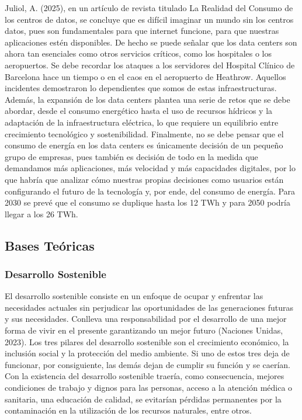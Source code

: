 \documentclass[stu,12pt,a4paper]{apa7}
\begin{document}
Juliol, A. (2025), en un artículo de revista titulado La Realidad del Consumo de los centros de datos, se concluye que es difícil imaginar un mundo sin los centros datos, pues son fundamentales para que internet funcione, para que nuestras aplicaciones estén disponibles. De hecho se puede señalar que los data centers son ahora tan esenciales como otros servicios críticos, como los hospitales o los aeropuertos. Se debe recordar los ataques a los servidores del Hospital Clínico de Barcelona hace un tiempo o en el caos en el aeropuerto de Heathrow. Aquellos incidentes demostraron lo dependientes que somos de estas infraestructuras. Además, la expansión de los data centers plantea una serie de retos que se debe abordar, desde el consumo energético hasta el uso de recursos hídricos y la adaptación de la infraestructura eléctrica, lo que requiere un equilibrio entre crecimiento tecnológico y sostenibilidad. Finalmente, no se debe pensar que el consumo de energía en los data centers es únicamente decisión de un pequeño grupo de empresas, pues también es decisión de todo en la medida que demandamos más aplicaciones, más velocidad y más capacidades digitales, por lo que habría que analizar cómo nuestras propias decisiones como usuarios están configurando el futuro de la tecnología y, por ende, del consumo de energía. Para 2030 se prevé que el consumo se duplique hasta los 12 TWh y para 2050 podría llegar a los 26 TWh.

    \subsection{Bases Teóricas}
    \subsubsection{Desarrollo Sostenible}
El desarrollo sostenible consiste en un enfoque de ocupar y enfrentar las necesidades actuales sin perjudicar las oportunidades de las generaciones futuras y sus necesidades. Conlleva una responsabilidad por el desarrollo de una mejor forma de vivir en el presente garantizando un mejor futuro (Naciones Unidas, 2023). Los tres pilares del desarrollo sostenible son el crecimiento económico, la inclusión social y la protección del medio ambiente. Si uno de estos tres deja de funcionar, por consiguiente, las demás dejan de cumplir su función y se caerían. Con la existencia del desarrollo sostenible traería, como consecuencia, mejores condiciones de trabajo y dignos para las personas, acceso a la atención médica o sanitaria, una educación de calidad, se evitarían pérdidas permanentes por la contaminación en la utilización de los recursos naturales, entre otros.
\end{document}
